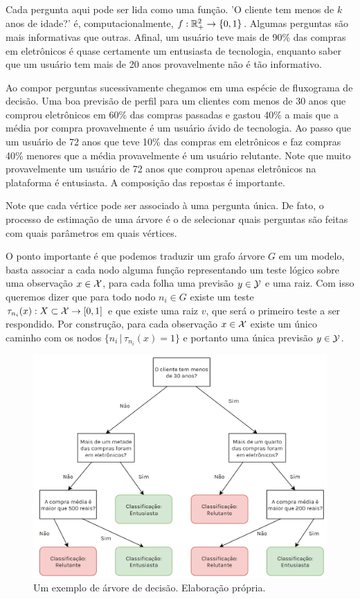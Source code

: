 \begin{exemplo}
Cada pergunta aqui pode ser lida como uma função. 'O cliente tem menos de $k$ anos de idade?' é, computacionalmente,  $f: \mathbb{R}^2_+ \to \{0, 1\}$. Algumas perguntas são mais informativas que outras. Afinal, um usuário teve mais de 90\% das compras em eletrônicos é quase certamente um entusiasta de tecnologia, enquanto saber que um usuário tem mais de 20 anos provavelmente não é tão informativo. 

Ao compor perguntas sucessivamente chegamos em uma espécie de fluxograma de decisão. Uma boa previsão de perfil para um clientes com menos de 30 anos que comprou eletrônicos em 60\% das compras passadas e gastou 40\% a mais que a média por compra provavelmente é um usuário ávido de tecnologia. Ao passo que um usuário de 72 anos que teve 10\% das compras em eletrônicos e faz compras 40\% menores que a média provavelmente é um usuário relutante. Note que muito provavelmente um usuário de 72 anos que comprou apenas eletrônicos na plataforma é entusiasta. A composição das repostas é importante.

Note que cada vértice pode ser associado à uma pergunta única. De fato, o processo de estimação de uma árvore é o de selecionar quais perguntas são feitas com quais parâmetros em quais vértices. 
\end{exemplo}

O ponto importante é que podemos traduzir um grafo árvore $G$ em um modelo, basta associar a cada nodo alguma função representando um teste lógico sobre uma observação $x \in \mathcal{X}$, para cada folha uma previsão $y \in \mathcal{Y}$ e uma raiz. Com isso queremos dizer que para todo nodo $n_i \in G$ existe um teste $\tau_{n_i}(x) : X \subset \mathcal{X} \to [0, 1]$ e que existe uma raiz $v$, que será o primeiro teste a ser respondido. Por construção, para cada observação $x \in \mathcal{X}$ existe um único caminho com os nodos $ \{n_i \, | \, \tau_{n_i}(x) = 1\}$ e portanto uma única previsão $y \in \mathcal{Y}$. 


\begin{figure}
    \centering
    \includegraphics[scale = .55]{imagens/arvore.png}
    \caption{Um exemplo de árvore de decisão. Elaboração própria.}
    \label{fig:arvore}
\end{figure}


